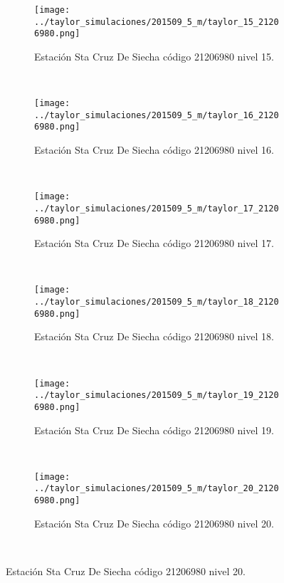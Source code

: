 \begin{figure}[H]
\centering
\begin{subfigure}[normla]{0.4\textwidth}
\caption{Estación Sta Cruz De Siecha  código 21206980 nivel 15.}
\texttt{[image: ../taylor\_simulaciones/201509\_5\_m/taylor\_15\_21206980.png]}
\end{subfigure}
~
\begin{subfigure}[normla]{0.4\textwidth}
\caption{Estación Sta Cruz De Siecha  código 21206980 nivel 16.}
\texttt{[image: ../taylor\_simulaciones/201509\_5\_m/taylor\_16\_21206980.png]}
\end{subfigure}
~
\begin{subfigure}[normla]{0.4\textwidth}
\caption{Estación Sta Cruz De Siecha  código 21206980 nivel 17.}
\texttt{[image: ../taylor\_simulaciones/201509\_5\_m/taylor\_17\_21206980.png]}
\end{subfigure}
~
\begin{subfigure}[normla]{0.4\textwidth}
\caption{Estación Sta Cruz De Siecha  código 21206980 nivel 18.}
\texttt{[image: ../taylor\_simulaciones/201509\_5\_m/taylor\_18\_21206980.png]}
\end{subfigure}
~
\begin{subfigure}[normla]{0.4\textwidth}
\caption{Estación Sta Cruz De Siecha  código 21206980 nivel 19.}
\texttt{[image: ../taylor\_simulaciones/201509\_5\_m/taylor\_19\_21206980.png]}
\end{subfigure}
~
\begin{subfigure}[normla]{0.4\textwidth}
\caption{Estación Sta Cruz De Siecha  código 21206980 nivel 20.}
\texttt{[image: ../taylor\_simulaciones/201509\_5\_m/taylor\_20\_21206980.png]}
\end{subfigure}
~
\end{figure}
           
